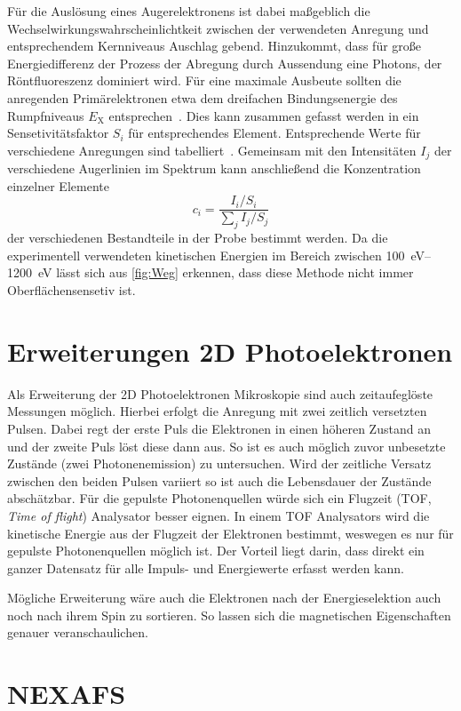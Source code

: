         Für die Auslösung eines Augerelektronens ist dabei maßgeblich die Wechselwirkungswahrscheinlichtkeit zwischen der verwendeten Anregung und entsprechendem Kernniveaus Auschlag gebend.
        Hinzukommt, dass für große Energiedifferenz der Prozess der Abregung durch Aussendung eine Photons, der Röntfluoreszenz dominiert wird.
        Für eine maximale Ausbeute sollten die anregenden Primärelektronen etwa dem dreifachen Bindungsenergie des Rumpfniveaus $E_\text{X}$ entsprechen~\cite{Fauster}.
        Dies kann zusammen gefasst werden in ein Sensetivitätsfaktor $S_i$ für entsprechendes Element.
        Entsprechende Werte für verschiedene Anregungen sind tabelliert~\cite{Auger}.
        Gemeinsam mit den Intensitäten $I_j$ der verschiedene Augerlinien im Spektrum kann anschließend die Konzentration einzelner Elemente
        \begin{equation}
            c_i = \frac{I_i/S_i}{\sum_j I_j/S_j}
            \label{eqn:Auger}
        \end{equation}
        der verschiedenen Bestandteile in der Probe bestimmt werden.
        Da die experimentell verwendeten kinetischen Energien im Bereich zwischen \SIrange[range-phrase=\:und\:]{100}{1200}{\electronvolt} lässt sich aus \autoref{fig:Weg} erkennen, dass diese Methode nicht immer Oberflächensensetiv ist.

    \section{Erweiterungen 2D Photoelektronen}
        Als Erweiterung der 2D Photoelektronen Mikroskopie sind auch zeitaufeglöste Messungen möglich.
        Hierbei erfolgt die Anregung mit zwei zeitlich versetzten Pulsen. 
        Dabei regt der erste Puls die Elektronen in einen höheren Zustand an und der zweite Puls löst diese dann aus.
        So ist es auch möglich zuvor unbesetzte Zustände (zwei Photonenemission) zu untersuchen.
        Wird der zeitliche Versatz zwischen den beiden Pulsen variiert so ist auch die Lebensdauer der Zustände abschätzbar.
        Für die gepulste Photonenquellen würde sich ein Flugzeit (TOF, \textit{Time of flight}) Analysator besser eignen.
        In einem TOF Analysators wird die kinetische Energie aus der Flugzeit der Elektronen bestimmt, weswegen es nur für gepulste Photonenquellen möglich ist.
        Der Vorteil liegt darin, dass direkt ein ganzer Datensatz für alle Impuls- und Energiewerte erfasst werden kann.

        Mögliche Erweiterung wäre auch die Elektronen nach der Energieselektion auch noch nach ihrem Spin zu sortieren.
        So lassen sich die magnetischen Eigenschaften genauer veranschaulichen.
    
    \section{NEXAFS}